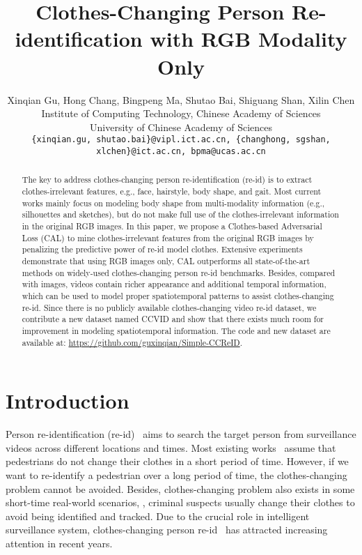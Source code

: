 \documentclass[10pt,twocolumn,letterpaper]{article}
\begin{document}
\title{Clothes-Changing Person Re-identification with RGB Modality Only}

\author{Xinqian Gu, Hong Chang, Bingpeng Ma, Shutao Bai, Shiguang Shan, Xilin Chen\\
Institute of Computing Technology, Chinese Academy of Sciences\\
University of Chinese Academy of Sciences\\
{\tt\small \{xinqian.gu, shutao.bai\}@vipl.ict.ac.cn, \{changhong, sgshan, xlchen\}@ict.ac.cn, bpma@ucas.ac.cn}
}

\maketitle

\begin{abstract}
	The key to address clothes-changing person re-identification (re-id) is to extract clothes-irrelevant features, e.g., face, hairstyle, body shape, and gait.
	Most current works mainly focus on modeling body shape from multi-modality information (e.g., silhouettes and sketches), but do not make full use of the clothes-irrelevant information in the original RGB images.
	In this paper, we propose a Clothes-based Adversarial Loss (CAL) to mine clothes-irrelevant features from the original RGB images by penalizing the predictive power of re-id model \wrt clothes.
	Extensive experiments demonstrate that using RGB images only, CAL outperforms all state-of-the-art methods on widely-used clothes-changing person re-id benchmarks.
	Besides, compared with images, videos contain richer appearance and additional temporal information, which can be used to model proper spatiotemporal patterns to assist clothes-changing re-id.
	Since there is no publicly available clothes-changing video re-id dataset, we contribute a new dataset named CCVID and show that there exists much room for improvement in modeling spatiotemporal information.
	The code and new dataset are available at: \url{https://github.com/guxinqian/Simple-CCReID}.
\end{abstract}

\section{Introduction}
\label{sec:intro}

Person re-identification (re-id)~\cite{Zheng2015Scalable, gu2019TKP,Hou2021FC} aims to search the target person from surveillance videos across different locations and times.
Most existing works~\cite{Sun2018Beyond,Gu2020AP3D,Hou2020TCL} assume that pedestrians do not change their clothes in a short period of time.
However, if we want to re-identify a pedestrian over a long period of time, the clothes-changing problem cannot be avoided. Besides, clothes-changing problem also exists in some short-time real-world scenarios, \eg, criminal suspects usually change their clothes to avoid being identified and tracked.
Due to the crucial role in intelligent surveillance system, clothes-changing person re-id~\cite{Yang2019PRCC, Fan2020Radio} has attracted increasing attention in recent years.
\end{document}
